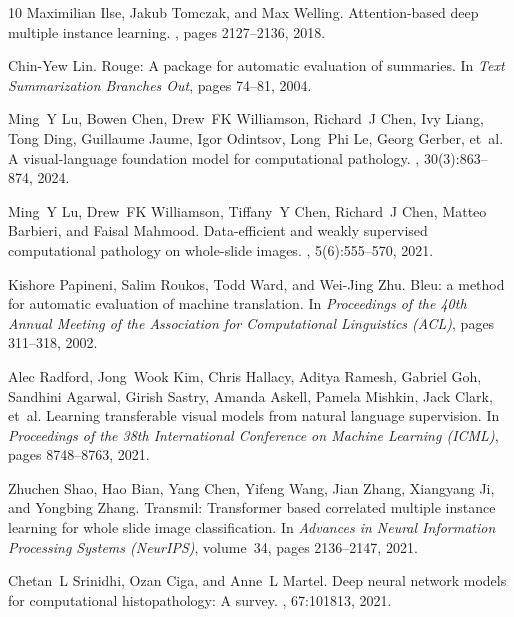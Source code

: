 \documentclass[11pt,a4paper]{article}
\begin{document}
\begin{thebibliography}{10}
Maximilian Ilse, Jakub Tomczak, and Max Welling.
\newblock Attention-based deep multiple instance learning.
, pages 2127--2136, 2018.

Chin-Yew Lin.
\newblock Rouge: A package for automatic evaluation of summaries.
\newblock In {\em Text Summarization Branches Out}, pages 74--81, 2004.

Ming~Y Lu, Bowen Chen, Drew~FK Williamson, Richard~J Chen, Ivy Liang, Tong
  Ding, Guillaume Jaume, Igor Odintsov, Long~Phi Le, Georg Gerber, et~al.
\newblock A visual-language foundation model for computational pathology.
, 30(3):863--874, 2024.

Ming~Y Lu, Drew~FK Williamson, Tiffany~Y Chen, Richard~J Chen, Matteo Barbieri,
  and Faisal Mahmood.
\newblock Data-efficient and weakly supervised computational pathology on
  whole-slide images.
, 5(6):555--570, 2021.

Kishore Papineni, Salim Roukos, Todd Ward, and Wei-Jing Zhu.
\newblock Bleu: a method for automatic evaluation of machine translation.
\newblock In {\em Proceedings of the 40th Annual Meeting of the Association for
  Computational Linguistics (ACL)}, pages 311--318, 2002.

Alec Radford, Jong~Wook Kim, Chris Hallacy, Aditya Ramesh, Gabriel Goh,
  Sandhini Agarwal, Girish Sastry, Amanda Askell, Pamela Mishkin, Jack Clark,
  et~al.
\newblock Learning transferable visual models from natural language
  supervision.
\newblock In {\em Proceedings of the 38th International Conference on Machine
  Learning (ICML)}, pages 8748--8763, 2021.

Zhuchen Shao, Hao Bian, Yang Chen, Yifeng Wang, Jian Zhang, Xiangyang Ji, and
  Yongbing Zhang.
\newblock Transmil: Transformer based correlated multiple instance learning for
  whole slide image classification.
\newblock In {\em Advances in Neural Information Processing Systems (NeurIPS)},
  volume~34, pages 2136--2147, 2021.

Chetan~L Srinidhi, Ozan Ciga, and Anne~L Martel.
\newblock Deep neural network models for computational histopathology: A
  survey.
, 67:101813, 2021.


\end{thebibliography}
\end{document}
